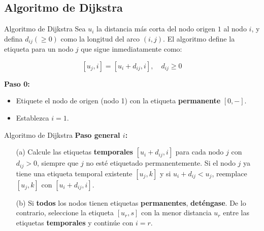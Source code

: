 \documentclass{beamer}
\begin{document}
\subsection{Algoritmo de Dijkstra}
\begin{frame}{Algoritmo de Dijkstra}
    Sea \( u_i \) la distancia más corta del nodo origen \( 1 \) al nodo \( i \), y defina \( d_{ij} (\geq 0) \) como la longitud del arco \( (i,j) \). El algoritmo define la etiqueta para un nodo \( j \) que sigue inmediatamente como:
    
    \[
    [u_j, i] = [u_i + d_{ij}, i], \quad d_{ij} \geq 0
    \]

    \textbf{Paso 0:} 
    \begin{itemize}
        \item Etiquete el nodo de origen (nodo 1) con la etiqueta \textbf{permanente} \( [0, -] \).
        \item Establezca \( i = 1 \).
    \end{itemize}
\end{frame}

\begin{frame}{Algoritmo de Dijkstra}
    \textbf{Paso general \( i \):}
    \begin{enumerate}
        \item[(a)] Calcule las etiquetas \textbf{temporales} \( [u_i + d_{ij}, i] \) para cada nodo \( j \) con \( d_{ij} > 0 \), siempre que \( j \) no esté etiquetado permanentemente. Si el nodo \( j \) ya tiene una etiqueta temporal existente \( [u_j, k] \) y si \( u_i + d_{ij} < u_j \), reemplace \( [u_j, k] \) con \( [u_i + d_{ij}, i] \).
        \item[(b)] Si \textbf{todos} los nodos tienen etiquetas \textbf{permanentes}, \textbf{deténgase}. De lo contrario, seleccione la etiqueta \( [u_r, s] \) con la menor distancia \( u_r \) entre las etiquetas \textbf{temporales} y continúe con \( i = r \).
    \end{enumerate}
\end{frame}

\end{document}
